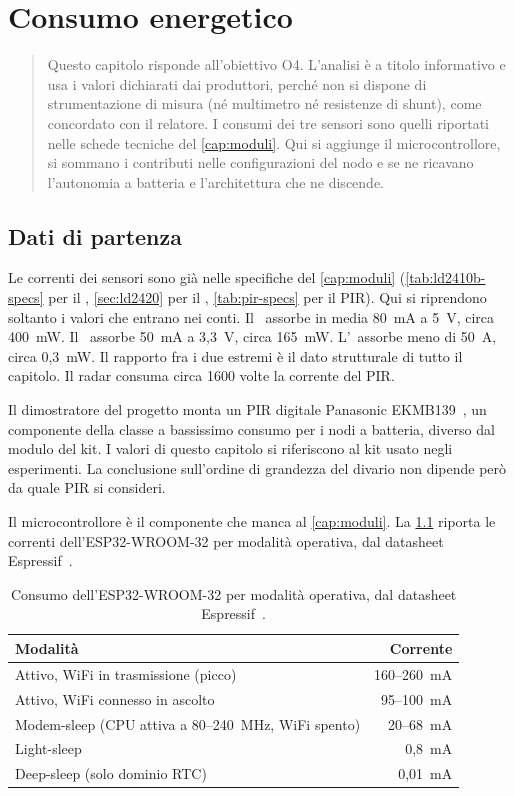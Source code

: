 \chapter{Consumo energetico}
\label{cap:consumi}

\begin{quote}\small
Questo capitolo risponde all'obiettivo O4. L'analisi è a titolo informativo e usa i
valori dichiarati dai produttori, perché non si dispone di strumentazione di misura
(né multimetro né resistenze di shunt), come concordato con il relatore. I consumi dei
tre sensori sono quelli riportati nelle schede tecniche del \cref{cap:moduli}. Qui si
aggiunge il microcontrollore, si sommano i contributi nelle configurazioni del nodo e
se ne ricavano l'autonomia a batteria e l'architettura che ne discende.
\end{quote}

\section{Dati di partenza}
\label{sec:consumi-dati}

Le correnti dei sensori sono già nelle specifiche del \cref{cap:moduli}
(\cref{tab:ld2410b-specs} per il \ldb, \cref{sec:ld2420} per il \ldc,
\cref{tab:pir-specs} per il PIR). Qui si riprendono soltanto i valori che entrano nei
conti. Il \ldb\ assorbe in media 80~mA a 5~V, circa 400~mW. Il \ldc\ assorbe 50~mA a
3,3~V, circa 165~mW. L'\pir\ assorbe meno di 50~\textmu A, circa 0,3~mW. Il rapporto
fra i due estremi è il dato strutturale di tutto il capitolo. Il radar consuma circa
1600 volte la corrente del PIR.

Il dimostratore del progetto monta un PIR digitale Panasonic
EKMB139~\cite{callisto2026dipme}, un componente della classe a bassissimo consumo per
i nodi a batteria, diverso dal modulo del kit. I valori di questo capitolo si
riferiscono al kit usato negli esperimenti. La conclusione sull'ordine di grandezza
del divario non dipende però da quale PIR si consideri.

Il microcontrollore è il componente che manca al \cref{cap:moduli}. La
\cref{tab:consumi-esp32} riporta le correnti dell'ESP32-WROOM-32 per modalità
operativa, dal datasheet Espressif~\cite{esp32datasheet}.

\begin{table}[htbp]
\centering
\caption{Consumo dell'ESP32-WROOM-32 per modalità operativa, dal datasheet
Espressif~\cite{esp32datasheet}.}
\label{tab:consumi-esp32}
\small
\begin{tabular}{@{}lr@{}}
\toprule
\textbf{Modalità} & \textbf{Corrente} \\
\midrule
Attivo, WiFi in trasmissione (picco) & 160--260~mA \\
Attivo, WiFi connesso in ascolto & 95--100~mA \\
Modem-sleep (CPU attiva a 80--240~MHz, WiFi spento) & 20--68~mA \\
Light-sleep & 0,8~mA \\
Deep-sleep (solo dominio RTC) & 0,01~mA \\
\bottomrule
\end{tabular}
\end{table}

